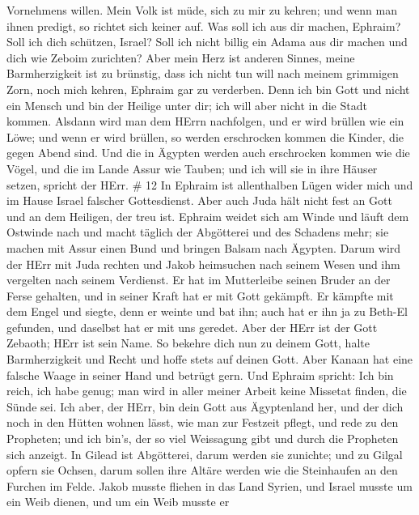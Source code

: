 Vornehmens willen.  Mein Volk ist müde, sich zu mir zu
kehren; und wenn man ihnen predigt, so richtet sich keiner auf.
 Was soll ich aus dir machen, Ephraim? Soll ich dich
schützen, Israel? Soll ich nicht billig ein Adama aus dir machen und
dich wie Zeboim zurichten? Aber mein Herz ist anderen Sinnes, meine
Barmherzigkeit ist zu brünstig,  dass ich nicht tun will
nach meinem grimmigen Zorn, noch mich kehren, Ephraim gar zu verderben.
Denn ich bin Gott und nicht ein Mensch und bin der Heilige unter dir;
ich will aber nicht in die Stadt kommen.  Alsdann wird man
dem HErrn nachfolgen, und er wird brüllen wie ein Löwe; und wenn er wird
brüllen, so werden erschrocken kommen die Kinder, die gegen Abend sind.
 Und die in Ägypten werden auch erschrocken kommen wie die
Vögel, und die im Lande Assur wie Tauben; und ich will sie in ihre
Häuser setzen, spricht der HErr. \# 12  In Ephraim ist
allenthalben Lügen wider mich und im Hause Israel falscher Gottesdienst.
Aber auch Juda hält nicht fest an Gott und an dem Heiligen, der treu
ist.  Ephraim weidet sich am Winde und läuft dem Ostwinde
nach und macht täglich der Abgötterei und des Schadens mehr; sie machen
mit Assur einen Bund und bringen Balsam nach Ägypten.  Darum
wird der HErr mit Juda rechten und Jakob heimsuchen nach seinem Wesen
und ihm vergelten nach seinem Verdienst.  Er hat im
Mutterleibe seinen Bruder an der Ferse gehalten, und in seiner Kraft hat
er mit Gott gekämpft.  Er kämpfte mit dem Engel und siegte,
denn er weinte und bat ihn; auch hat er ihn ja zu Beth-El gefunden, und
daselbst hat er mit uns geredet.  Aber der HErr ist der Gott
Zebaoth; HErr ist sein Name.  So bekehre dich nun zu deinem
Gott, halte Barmherzigkeit und Recht und hoffe stets auf deinen Gott.
 Aber Kanaan hat eine falsche Waage in seiner Hand und
betrügt gern.  Und Ephraim spricht: Ich bin reich, ich habe
genug; man wird in aller meiner Arbeit keine Missetat finden, die Sünde
sei.  Ich aber, der HErr, bin dein Gott aus Ägyptenland
her, und der dich noch in den Hütten wohnen lässt, wie man zur Festzeit
pflegt,  und rede zu den Propheten; und ich bin's, der so
viel Weissagung gibt und durch die Propheten sich anzeigt. 
In Gilead ist Abgötterei, darum werden sie zunichte; und zu Gilgal
opfern sie Ochsen, darum sollen ihre Altäre werden wie die Steinhaufen
an den Furchen im Felde.  Jakob musste fliehen in das Land
Syrien, und Israel musste um ein Weib dienen, und um ein Weib musste er
